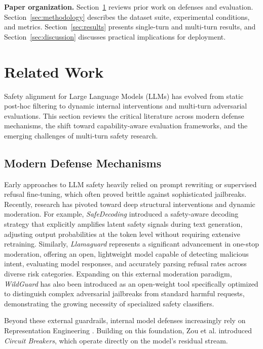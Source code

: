 \documentclass[10pt, twocolumn]{article}
\begin{document}
\textbf{Paper organization.} Section~\ref{sec:related_work} reviews prior work on defenses and evaluation. Section~\ref{sec:methodology} describes the dataset suite, experimental conditions, and metrics. Section~\ref{sec:results} presents single-turn and multi-turn results, and Section~\ref{sec:discussion} discusses practical implications for deployment.

\section{Related Work}
\label{sec:related_work}

Safety alignment for Large Language Models (LLMs) has evolved from static post-hoc filtering to dynamic internal interventions and multi-turn adversarial evaluations. This section reviews the critical literature across modern defense mechanisms, the shift toward capability-aware evaluation frameworks, and the emerging challenges of multi-turn safety research.

\subsection{Modern Defense Mechanisms}
Early approaches to LLM safety heavily relied on prompt rewriting or supervised refusal fine-tuning, which often proved brittle against sophisticated jailbreaks. Recently, research has pivoted toward deep structural interventions and dynamic moderation. For example, \textit{SafeDecoding} \cite{xu2024safedecoding} introduced a safety-aware decoding strategy that explicitly amplifies latent safety signals during text generation, adjusting output probabilities at the token level without requiring extensive retraining. Similarly, \textit{Llamaguard} \cite{inan2023llamaguard, fedorov2024llama} represents a significant advancement in one-stop moderation, offering an open, lightweight model capable of detecting malicious intent, evaluating model responses, and accurately parsing refusal rates across diverse risk categories. Expanding on this external moderation paradigm, \textit{WildGuard} \cite{han2024wildguard} has also been introduced as an open-weight tool specifically optimized to distinguish complex adversarial jailbreaks from standard harmful requests, demonstrating the growing necessity of specialized safety classifiers. 

Beyond these external guardrails, internal model defenses increasingly rely on Representation Engineering \citep{zou2023representation}. Building on this foundation, Zou et al. \cite{zou2024improving} introduced \textit{Circuit Breakers}, which operate directly on the model's residual stream. 
\end{document}
